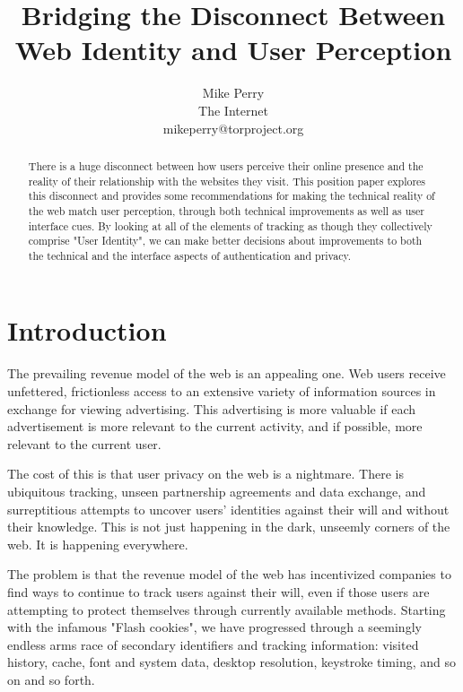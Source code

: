 \documentclass[letterpaper,11pt]{llncs}
\begin{document}
\title{Bridging the Disconnect Between Web Identity and User Perception}

\author{Mike Perry \\ The Internet \\ mikeperry@torproject.org}


\maketitle
\pagestyle{plain}

\begin{abstract}

There is a huge disconnect between how users perceive their online presence
and the reality of their relationship with the websites they visit. This
position paper explores this disconnect and provides some recommendations for
making the technical reality of the web match user perception, through both
technical improvements as well as user interface cues. By looking at all of
the elements of tracking as though they collectively comprise "User Identity",
we can make better decisions about improvements to both the technical and the
interface aspects of authentication and privacy.

\end{abstract}

\section{Introduction}

The prevailing revenue model of the web is an appealing one. Web users receive
unfettered, frictionless access to an extensive variety of information sources
in exchange for viewing advertising. This advertising is more valuable if each
advertisement is more relevant to the current activity, and if possible, more
relevant to the current user.

The cost of this is that user privacy on the web is a nightmare. There is
ubiquitous tracking, unseen partnership agreements and data exchange, and
surreptitious attempts to uncover users' identities against their will and
without their knowledge. This is not just happening in the dark, unseemly
corners of the web. It is happening everywhere\cite{facebook-like}.

The problem is that the revenue model of the web has incentivized companies to
find ways to continue to track users against their will, even if those users
are attempting to protect themselves through currently available methods.
Starting with the infamous "Flash cookies", we have progressed through a
seemingly endless arms race of secondary identifiers and tracking information:
visited history, cache, font and system data, desktop resolution, keystroke
timing, and so on and so forth\cite{wsj-fingerprinting}.
\end{document}
